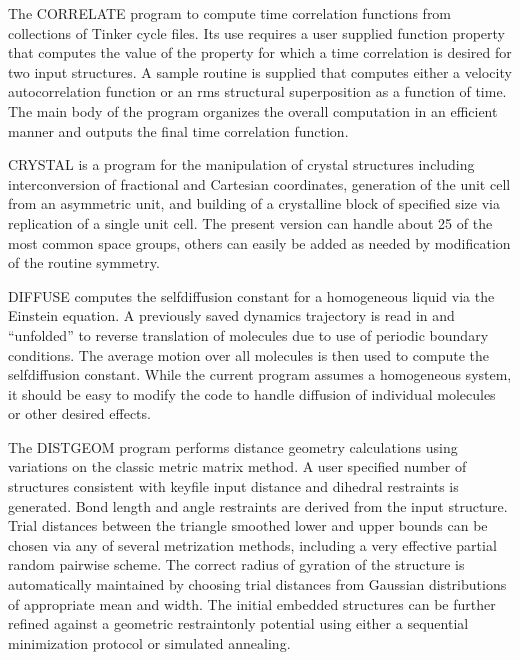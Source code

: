 \documentclass[letterpaper,11pt,english]{sphinxmanual}
\begin{document}

The CORRELATE program to compute time correlation functions from collections of Tinker cycle files. Its use requires a user supplied function property that computes the value of the property for which a time correlation is desired for two input structures. A sample routine is supplied that computes either a velocity autocorrelation function or an rms structural superposition as a function of time. The main body of the program organizes the overall computation in an efficient manner and outputs the final time correlation function.


CRYSTAL is a program for the manipulation of crystal structures including interconversion of fractional and Cartesian coordinates, generation of the unit cell from an asymmetric unit, and building of a crystalline block of specified size via replication of a single unit cell. The present version can handle about 25 of the most common space groups, others can easily be added as needed by modification of the routine symmetry.


DIFFUSE computes the self\sphinxhyphen{}diffusion constant for a homogeneous liquid via the Einstein equation. A previously saved dynamics trajectory is read in and “unfolded” to reverse translation of molecules due to use of periodic boundary conditions. The average motion over all molecules is then used to compute the self\sphinxhyphen{}diffusion constant. While the current program assumes a homogeneous system, it should be easy to modify the code to handle diffusion of individual molecules or other desired effects.


The DISTGEOM program performs distance geometry calculations using variations on the classic metric matrix method. A user specified number of structures consistent with keyfile input distance and dihedral restraints is generated. Bond length and angle restraints are derived from the input structure. Trial distances between the triangle smoothed lower and upper bounds can be chosen via any of several metrization methods, including a very effective partial random pairwise scheme. The correct radius of gyration of the structure is automatically maintained by choosing trial distances from Gaussian distributions of appropriate mean and width. The initial embedded structures can be further refined against a geometric restraint\sphinxhyphen{}only potential using either a sequential minimization protocol or simulated annealing.
\end{document}
